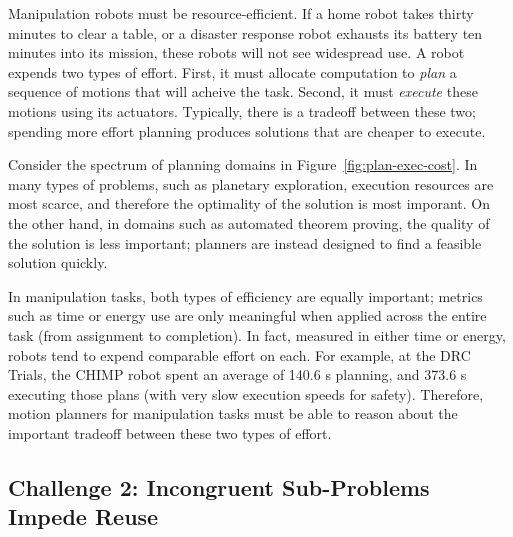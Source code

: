 
Manipulation robots must be resource-efficient.
If a home robot takes thirty minutes to clear a table,
or a disaster response robot exhausts its battery ten minutes
into its mission,
these robots will not see widespread use.
A robot expends two types of effort.
First, it must allocate computation to \emph{plan}
a sequence of motions that will acheive the task.
Second, it must \emph{execute} these motions using its actuators.
Typically, there is a tradeoff between these two;
spending more effort planning produces solutions that are
cheaper to execute.

Consider the spectrum of planning domains
in Figure~\ref{fig:plan-exec-cost}.
In many types of problems,
such as planetary exploration,
execution resources are most scarce,
and therefore the optimality of the solution is most imporant.
On the other hand,
in domains such as automated theorem proving,
the quality of the solution is less important;
planners are instead designed to find a feasible solution quickly.

In manipulation tasks,
both types of efficiency are equally important;
metrics such as time or energy use are only meaningful
when applied across the entire task (from assignment to completion).
In fact, measured in either time or energy,
robots tend to expend comparable effort on each.
For example, at the DRC Trials,
the CHIMP robot spent an average of 140.6 s planning,
and 373.6 s executing those plans
(with very slow execution speeds for safety).
Therefore,
motion planners for manipulation tasks must be able to reason about
the important tradeoff between these two types of effort.

\subsection*{Challenge 2: Incongruent Sub-Problems Impede Reuse}

